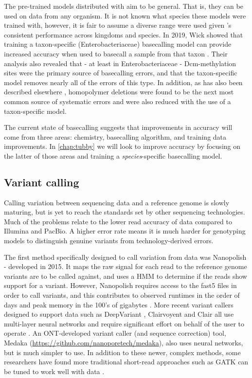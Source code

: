 \noindent
The pre-trained models distributed with \guppy{} aim to be general. That is, they can be used on \ont{} data from any organism. It is not known what species these models were trained with, however, it is fair to assume a diverse range were used given \guppy{}'s consistent performance across kingdoms and species. In 2019, Wick \etal{} showed that training a taxon-specific (Enterobacteriaceae) basecalling model can provide increased accuracy when used to basecall a sample from that taxon \cite{wick2019}. Their analysis also revealed that - at least in Enterobacteriaceae - Dcm-methylation sites were the primary source of \guppy{} basecalling errors, and that the taxon-specific model removes nearly all of the errors of this type. In addition, as has also been described elsewhere \cite{watson2019}, homopolymer deletions were found to be the next most common source of systematic errors and were also reduced with the use of a taxon-specific model.

The current state of \ont{} basecalling suggests that improvements in accuracy will come from three areas: chemistry, basecalling algorithm, and training data improvements. In \autoref{chap:tubby} we will look to improve \ont{} accuracy by focusing on the latter of those areas and training a \emph{species}-specific basecalling model.

\subsection{Variant calling}
\label{sec:ont-var-calling-intro}

Calling variation between \ont{} sequencing data and a reference genome is slowly maturing, but is yet to reach the standards set by other sequencing technologies. Much of the problems relate to the lower read accuracy of \ont{} data compared to Illumina and PacBio. A higher error rate means it is much harder for genotyping models to distinguish genuine variants from technology-derived errors.

The first method specifically designed to call variation from \ont{} data was Nanopolish \cite{nanopolish2015,nanopolish2017} - developed in 2015. It maps the raw signal for each read to the reference genome variants are to be called against, and uses a HMM to determine if the reads show support for a variant. However, Nanopolish requires access to the fast5 files in order to call variants, and this contributes to observed runtimes in the order of days and peak memory in the 100's of gigabytes \cite{clairvoyant2019}. More recent variant callers designed to support \ont{} data such as DeepVariant \cite{deepvariant}, Clairvoyent \cite{clairvoyant2019} and Clair \cite{clair2020} all use multi-layer neural networks and require significant effort on behalf of the user to operate \cite{sanderson2020}. An ONT-developed variant caller (and sequence correction) tool, Medaka (\url{https://github.com/nanoporetech/medaka}), also uses neural networks, but is much simpler to use. In addition to these newer, complex methods, some researchers have found more traditional short-read approaches such as GATK \cite{Poplin2018} can be tuned to work well with \ont{} data \cite{greig2021,bainomugisa2018,Greig2019}.

